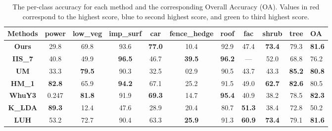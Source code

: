 \documentclass[final,3p,times,twocolumn,authoryear]{elsarticle}
\begin{document}
\begin{table*}[]
\centering
\caption{The per-class accuracy for each method and the corresponding Overall Accuracy (OA). Values in red correspond to the highest score, blue to second highest score, and green to third highest score.}
\label{tab:accuracy}
\begin{tabular}{c|ccccccccc|l}
\textbf{Methods} & \textbf{power}  & \textbf{low\_veg}  & \textbf{imp\_surf} & \textbf{car} & \textbf{fence\_hedge} & \textbf{roof} & \textbf{fac} & \textbf{shrub} & \textbf{tree} & \textbf{OA}   \\ \hline
\textbf{Ours}   & 29.8   & 69.8    & 93.6   & {\color[HTML]{FE0000} \textbf{77.0}} & 10.4  & 92.9   & 47.4   & {\color[HTML]{FE0000} \textbf{73.4}} & 79.3   & {\color[HTML]{3531FF} \textbf{81.6}} \\
\textbf{IIS\_7} & 40.8  & 49.9 & {\color[HTML]{FE0000} \textbf{96.5}} & 46.7 & {\color[HTML]{FE0000} \textbf{39.5}} & {\color[HTML]{FE0000} \textbf{96.2}} & --- & 52.0 & 68.8 & 76.2                \\
\textbf{UM}     & 33.3  & {\color[HTML]{3531FF} \textbf{79.5}}  & 90.3 & 32.5 & 02.9 & 90.5 & 43.7  & 43.3    & {\color[HTML]{FE0000} \textbf{85.2}} & {\color[HTML]{009901}\textbf{80.8}}          \\
\textbf{HM\_1}  & {\color[HTML]{3531FF} \textbf{82.8}} & 65.9 & {\color[HTML]{3531FF} \textbf{94.2}} & 67.1 & 25.2 & 91.5 & 49.0 & {\color[HTML]{3531FF} \textbf{62.7}} & {\color[HTML]{3531FF} \textbf{82.6}} & 80.5 \\
\textbf{WhuY3}  & 0.247 & {\color[HTML]{FE0000} \textbf{81.8}} & 91.9 & {\color[HTML]{3531FF} \textbf{69.3}} & 14.7 & {\color[HTML]{3531FF} \textbf{95.4}} & 40.9 & 38.2 & 78.5 & {\color[HTML]{FE0000} \textbf{82.3}} \\
\textbf{K\_LDA} & {\color[HTML]{FE0000} \textbf{89.3}} & 12.4 & 47.6 & 28.9 & 20.4 & 80.7 & {\color[HTML]{3531FF} \textbf{51.3}} & 38.4 & 72.8 & 50.2                          \\
\textbf{LUH} & 53.2 & 72.7 & 90.4 & 63.3 & {\color[HTML]{3531FF} \textbf{25.9}} & 91.3 & {\color[HTML]{FE0000} \textbf{60.9}} & {\color[HTML]{FE0000} \textbf{73.4}} & 79.1 & {\color[HTML]{3531FF} \textbf{81.6}} \\

\end{tabular}
\end{table*}
\end{document}
